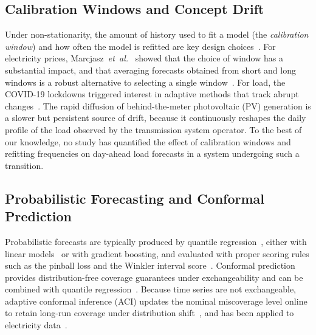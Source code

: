 \subsection{Calibration Windows and Concept Drift}
Under non-stationarity, the amount of history used to fit a model (the \emph{calibration window}) and how often the model is refitted are key design choices~\cite{gama2014drift}. For electricity prices, Marcjasz~\emph{et~al.}~\cite{marcjasz2018windows} showed that the choice of window has a substantial impact, and that averaging forecasts obtained from short and long windows is a robust alternative to selecting a single window~\cite{hubicka2019windows,serafin2019windows}. For load, the COVID-19 lockdowns triggered interest in adaptive methods that track abrupt changes~\cite{obst2021covid}. The rapid diffusion of behind-the-meter photovoltaic (PV) generation is a slower but persistent source of drift, because it continuously reshapes the daily profile of the load observed by the transmission system operator. To the best of our knowledge, no study has quantified the effect of calibration windows and refitting frequencies on day-ahead load forecasts in a system undergoing such a transition.

\subsection{Probabilistic Forecasting and Conformal Prediction}
Probabilistic forecasts are typically produced by quantile regression~\cite{koenker1978quantiles}, either with linear models~\cite{ziel2016lasso} or with gradient boosting, and evaluated with proper scoring rules such as the pinball loss and the Winkler interval score~\cite{gneiting2007scoring,winkler1972interval,nowotarski2018probabilistic}. Conformal prediction~\cite{vovk2022alrw} provides distribution-free coverage guarantees under exchangeability and can be combined with quantile regression~\cite{romano2019cqr}. Because time series are not exchangeable, adaptive conformal inference (ACI) updates the nominal miscoverage level online to retain long-run coverage under distribution shift~\cite{gibbs2021aci}, and has been applied to electricity data~\cite{zaffran2022aci}.

